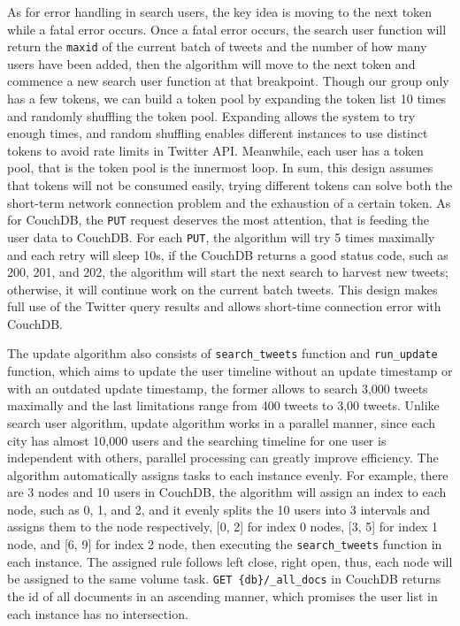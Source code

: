 As for error handling in search users, the key idea is moving to the next token while a fatal error occurs. Once a fatal error occurs, the search user function will return the \texttt{maxid} of the current batch of tweets and the number of how many users have been added, then the algorithm will move to the next token and commence a new search user function at that breakpoint. Though our group only has a few tokens, we can build a token pool by expanding the token list 10 times and randomly shuffling the token pool. Expanding allows the system to try enough times, and random shuffling enables different instances to use distinct tokens to avoid rate limits in Twitter API. Meanwhile, each user has a token pool, that is the token pool is the innermost loop. In sum, this design assumes that tokens will not be consumed easily, trying different tokens can solve both the short-term network connection problem and the exhaustion of a certain token. As for CouchDB, the \texttt{PUT} request deserves the most attention, that is feeding the user data to CouchDB. For each \texttt{PUT}, the algorithm will try 5 times maximally and each retry will sleep 10s, if the CouchDB returns a good status code, such as 200, 201, and 202, the algorithm will start the next search to harvest new tweets; otherwise, it will continue work on the current batch tweets. This design makes full use of the Twitter query results and allows short-time connection error with CouchDB. 

The update algorithm also consists of \texttt{search_tweets} function and \texttt{run_update} function, which aims to update the user timeline without an update timestamp or with an outdated update timestamp, the former allows to search 3,000 tweets maximally and the last limitations range from 400 tweets to 3,00 tweets. Unlike search user algorithm, update algorithm works in a parallel manner, since each city has almost 10,000 users and the searching timeline for one user is independent with others, parallel processing can greatly improve efficiency. The algorithm automatically assigns tasks to each instance evenly. For example, there are 3 nodes and 10 users in CouchDB, the algorithm will assign an index to each node, such as 0, 1, and 2, and it evenly splits the 10 users into 3 intervals and assigns them to the node respectively, [0, 2] for index 0 nodes, [3, 5] for index 1 node, and [6, 9] for index 2 node, then executing the \texttt{search_tweets} function in each instance. The assigned rule follows left close, right open, thus, each node will be assigned to the same volume task. \texttt{GET \{db\}/_all_docs} in CouchDB returns the id of all documents in an ascending manner, which promises the user list in each instance has no intersection.

